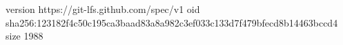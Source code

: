 version https://git-lfs.github.com/spec/v1
oid sha256:123182f4c50c195ca3baad83a8a982c3ef033c133d7f479bfecd8b14463bccd4
size 1988
